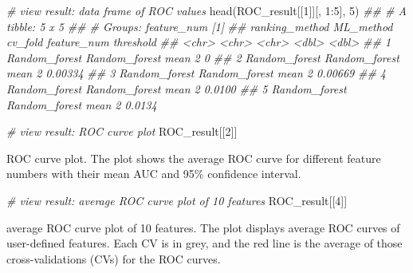 \documentclass[]{article}
\newcommand{\hlnum}[1]{\textcolor[rgb]{0.816,0.125,0.439}{#1}}%
\newcommand{\hlcom}[1]{\textcolor[rgb]{0.502,0.502,0.502}{\textit{#1}}}%
\newcommand{\hlopt}[1]{\textcolor[rgb]{0,0,0}{#1}}%
\newcommand{\hlstd}[1]{\textcolor[rgb]{0.251,0.251,0.251}{#1}}%
\newcommand{\hlkwd}[1]{\textcolor[rgb]{0.878,0.439,0.125}{#1}}%
\newenvironment{Shaded}{\begin{myshaded}}{\end{myshaded}}
\newcommand{\KeywordTok}[1]{\hlkwd{#1}}
\newcommand{\DecValTok}[1]{\hlnum{#1}}
\newcommand{\CommentTok}[1]{\hlcom{#1}}
\newcommand{\OperatorTok}[1]{\hlopt{#1}}
\newcommand{\NormalTok}[1]{\hlstd{#1}}
\begin{document}
\begin{Shaded}
\begin{Highlighting}[]
\CommentTok{# view result: data frame of ROC values}
\KeywordTok{head}\NormalTok{(ROC_result[[}\DecValTok{1}\NormalTok{]][, }\DecValTok{1}\OperatorTok{:}\DecValTok{5}\NormalTok{], }\DecValTok{5}\NormalTok{)}
\CommentTok{## # A tibble: 5 x 5}
\CommentTok{## # Groups:   feature_num [1]}
\CommentTok{##   ranking_method ML_method     cv_fold feature_num threshold}
\CommentTok{##   <chr>          <chr>         <chr>         <dbl>     <dbl>}
\CommentTok{## 1 Random_forest  Random_forest mean              2   0      }
\CommentTok{## 2 Random_forest  Random_forest mean              2   0.00334}
\CommentTok{## 3 Random_forest  Random_forest mean              2   0.00669}
\CommentTok{## 4 Random_forest  Random_forest mean              2   0.0100 }
\CommentTok{## 5 Random_forest  Random_forest mean              2   0.0134}
\end{Highlighting}
\end{Shaded}

\begin{Shaded}
\begin{Highlighting}[]
\CommentTok{# view result: ROC curve plot}
\NormalTok{ROC_result[[}\DecValTok{2}\NormalTok{]]}
\end{Highlighting}
\end{Shaded}

\label{fig:unnamed-chunk-55}ROC curve plot. The plot shows the average ROC curve for different feature numbers with their mean AUC and 95\% confidence interval.

\begin{Shaded}
\begin{Highlighting}[]
\CommentTok{# view result: average ROC curve plot of 10 features}
\NormalTok{ROC_result[[}\DecValTok{4}\NormalTok{]]   }
\end{Highlighting}
\end{Shaded}

\label{fig:unnamed-chunk-56}average ROC curve plot of 10 features. The plot displays average ROC curves of user-defined features. Each CV is in grey, and the red line is the average of those cross-validations (CVs) for the ROC curves.
\end{document}
